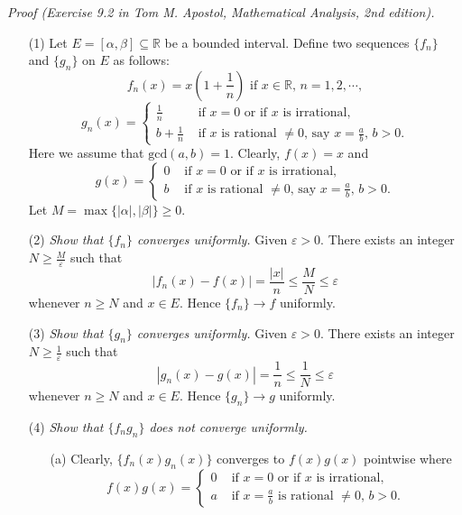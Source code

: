 \documentclass{article}
\begin{document}
\emph{Proof (Exercise 9.2 in Tom M. Apostol, Mathematical Analysis, 2nd edition).}
\begin{enumerate}
  \item[(1)]
  Let $E = [\alpha,\beta] \subseteq \mathbb{R}$ be a bounded interval.
  Define two sequences $\{f_n\}$ and $\{g_n\}$ on $E$ as follows:
  \[
    f_n(x) = x \left( 1+\frac{1}{n} \right)
    \text{ if $x \in \mathbb{R}$, $n = 1,2,\cdots$},
  \]
  \begin{equation*}
  g_n(x) =
    \begin{cases}
      \frac{1}{n}   & \text{ if $x=0$ or if $x$ is irrational}, \\
      b+\frac{1}{n} & \text{ if $x$ is rational $\neq 0$, say $x=\frac{a}{b}$, $b>0$}.
    \end{cases}
  \end{equation*}
  Here we assume that $\mathrm{gcd}(a,b) = 1$.
  Clearly, $f(x) = x$ and
  \begin{equation*}
  g(x) =
    \begin{cases}
      0 & \text{ if $x=0$ or if $x$ is irrational}, \\
      b & \text{ if $x$ is rational $\neq 0$, say $x=\frac{a}{b}$, $b>0$}.
    \end{cases}
  \end{equation*}
  Let $M = \max\{|\alpha|,|\beta|\} \geq 0$.

  \item[(2)]
  \emph{Show that $\{f_n\}$ converges uniformly.}
  Given $\varepsilon > 0$.
  There exists an integer $N \geq \frac{M}{\varepsilon}$ such that
  \[
    |f_n(x) - f(x)| = \frac{|x|}{n} \leq \frac{M}{N} \leq \varepsilon
  \]
  whenever $n \geq N$ and $x \in E$.
  Hence $\{f_n\} \to f$ uniformly.

  \item[(3)]
  \emph{Show that $\{g_n\}$ converges uniformly.}
  Given $\varepsilon > 0$.
  There exists an integer $N \geq \frac{1}{\varepsilon}$ such that
  \[
    |g_n(x) - g(x)| = \frac{1}{n} \leq \frac{1}{N} \leq \varepsilon
  \]
  whenever $n \geq N$ and $x \in E$.
  Hence $\{g_n\} \to g$ uniformly.

  \item[(4)]
  \emph{Show that $\{f_n g_n\}$ does not converge uniformly.}
  \begin{enumerate}
    \item[(a)]
      Clearly, $\{f_n(x) g_n(x) \}$ converges to $f(x)g(x)$ pointwise
      where
      \begin{equation*}
      f(x) g(x) =
        \begin{cases}
          0 & \text{ if $x=0$ or if $x$ is irrational}, \\
          a & \text{ if $x=\frac{a}{b}$ is rational $\neq 0$, $b>0$}.
        \end{cases}
      \end{equation*}


\end{enumerate}
\end{enumerate}
\end{document}
